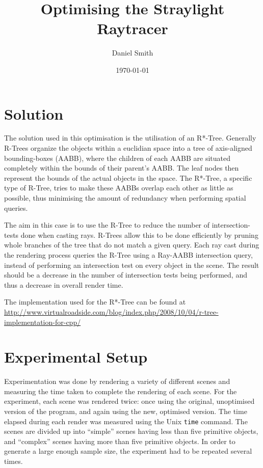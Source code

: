 \documentclass[a4paper]{article}
\title{Optimising the Straylight Raytracer}
\author{Daniel Smith}
\date{\today}
\begin{document}
\maketitle

\section{Solution}
The solution used in this optimisation is the utilisation of an R*-Tree. Generally R-Trees organize the objects within a euclidian space into a tree of axis-aligned bounding-boxes (AABB), where the children of each AABB are situated completely within the bounds of their parent's AABB. The leaf nodes then represent the bounds of the actual objects in the space. The R*-Tree, a specific type of R-Tree, tries to make these AABBs overlap each other as little as possible, thus minimising the amount of redundancy when performing spatial queries.

The aim in this case is to use the R-Tree to reduce the number of intersection-tests done when casting rays. R-Trees allow this to be done efficiently by pruning whole branches of the tree that do not match a given query. Each ray cast during the rendering process queries the R-Tree using a Ray-AABB intersection query, instead of performing an intersection test on every object in the scene. The result should be a decrease in the number of intersection tests being performed, and thus a decrease in overall render time.

\vspace{5 mm}

{\footnotesize
  The implementation used for the R*-Tree can be found at \url{http://www.virtualroadside.com/blog/index.php/2008/10/04/r-tree-implementation-for-cpp/}
}

\section{Experimental Setup}
Experimentation was done by rendering a variety of different scenes and measuring the time taken to complete the rendering of each scene. For the experiment, each scene was rendered twice: once using the original, unoptimised version of the program, and again using the new, optimised version. The time elapsed during each render was measured using the Unix \texttt{time} command. The scenes are divided up into ``simple'' scenes having less than five primitive objects, and ``complex'' scenes having more than five primitive objects. In order to generate a large enough sample size, the experiment had to be repeated several times.
\end{document}
